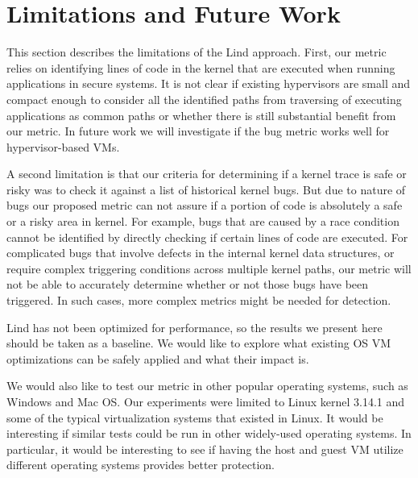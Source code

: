 \section{Limitations and Future Work}
\label{sec.limitation}

This section describes the limitations of the Lind approach.
First, our metric relies on identifying lines of code in the kernel that are executed when running applications in secure systems. It is not clear if existing hypervisors are small and compact enough to consider all the identified paths from traversing of executing applications as common paths or whether there is still substantial benefit from our metric. In %
future work we will %
investigate if the bug metric works well for %
hypervisor-based VMs.

A second limitation is that our criteria for determining if a kernel trace is safe or risky was to check it against a list of historical kernel bugs.  %
But due to nature of bugs our proposed metric can not assure if a portion of code is absolutely a safe or a risky area in kernel. For example, bugs that are caused by a race condition cannot be identified by directly checking if certain lines of code are executed. For complicated bugs that involve defects in the internal kernel data structures, or require complex triggering conditions across multiple kernel paths, our metric will not be able to accurately determine whether or not those bugs have been triggered. In such cases, more complex metrics might be needed for detection.  




Lind has not been optimized for performance, so the results we present here should be taken as a baseline. 
We would like to explore what existing OS VM optimizations can be safely applied and what their impact is.

We would also like to test our metric in other popular operating systems, such as Windows and Mac OS. Our experiments were limited to Linux kernel 3.14.1 and some of the typical virtualization systems that existed in Linux. It would be interesting 
if similar tests could be run in other widely-used operating systems. In particular, it would be interesting to see if having the host and guest VM utilize different operating systems provides better protection.


